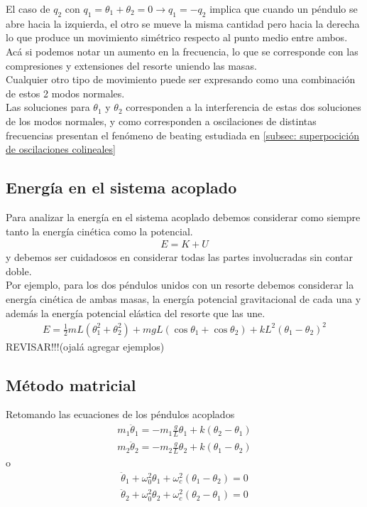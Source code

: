 \documentclass[12pt]{article}
\begin{document}
El caso de \(q_2 \) con \(q_1= \theta_1 + \theta_2 = 0 \rightarrow q_1 = - q_2\) implica que cuando un péndulo se abre hacia la izquierda, el otro se mueve la misma cantidad pero hacia la derecha lo que produce un movimiento simétrico respecto al punto medio entre ambos. Acá si podemos notar un aumento en la frecuencia, lo que se corresponde con las compresiones y extensiones del resorte uniendo las masas.\\

Cualquier otro tipo de movimiento puede ser expresando como una combinación de estos 2 modos normales.\\

Las soluciones para \(\theta_1\) y \(\theta_2\) corresponden a la interferencia de estas dos soluciones de los modos normales, y como corresponden a oscilaciones de distintas frecuencias presentan el fenómeno de beating estudiada en \ref{subsec: superpocición de oscilaciones colineales}

\subsection{Energía en el sistema acoplado}

Para analizar la energía en el sistema acoplado debemos considerar como siempre tanto la energía cinética como la potencial.
\begin{align*}
    E = K + U
\end{align*}
y debemos ser cuidadosos en considerar todas las partes involucradas sin contar doble.\\

Por ejemplo, para los dos péndulos unidos con un resorte debemos considerar la energía cinética de ambas masas, la energía potencial gravitacional de cada una y además la energía potencial elástica del resorte que las une.
\begin{align*}
    E= \frac{1}{2}mL(\theta_1^{2} + \theta_2^{2}) + mgL(\cos\theta_1 + \cos \theta_2) + kL^{2}(\theta_1 - \theta_2)^{2}
\end{align*}
{\color{red} REVISAR!!!(ojalá agregar ejemplos)}

\subsection{Método matricial  }

Retomando las ecuaciones de los péndulos acoplados
\begin{align*}
    m_1 \ddot{\theta}_1 = - m_1\frac{g}{L}\theta_1 + k(\theta_2 - \theta_1)\\
    m_2 \ddot{\theta}_2 = - m_2\frac{g}{L}\theta_2 + k(\theta_1 - \theta_2)
\end{align*}
o
\begin{align*}
     \ddot{\theta}_1 + \omega_0^{2}\theta_1 + \omega_c^{2}(\theta_1 - \theta_2)  = 0  \\
     \ddot{\theta}_2 +  \omega_0^{2}\theta_2 + \omega_c^{2}(\theta_2 - \theta_1)= 0
\end{align*}
\end{document}
